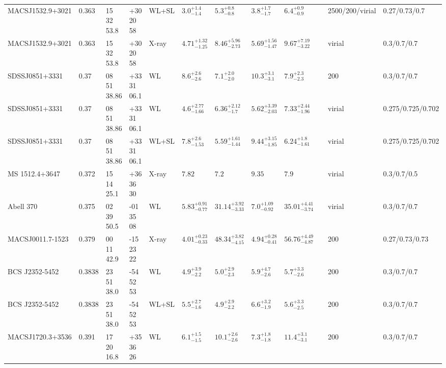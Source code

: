 \begin{landscape}
\begin{center}
{\begin{longtable}{llllllllllll}
MACSJ1532.9+3021 & 0.363 & 15 32 53.8 & +30 20 58 & WL+SL & ${3.0}^{+1.4}_{-1.4}$ & ${5.3}^{+0.8}_{-0.8}$ & ${3.8}^{+1.7}_{-1.7}$ & ${6.4}^{+0.9}_{-0.9}$ & \citet{ME14.1} & 2500/200/virial & 0.27/0.73/0.7 \\
MACSJ1532.9+3021 & 0.363 & 15 32 53.8 & +30 20 58 & X-ray & ${4.71}^{+1.32}_{-1.25}$ & ${8.46}^{+5.96}_{-2.73}$ & ${5.69}^{+1.56}_{-1.47}$ & ${9.67}^{+7.19}_{-3.22}$ & \citet{SC07.1} & virial & 0.3/0.7/0.7 \\
SDSSJ0851+3331 & 0.37 & 08 51 38.86 & +33 31 06.1 & WL & ${8.6}^{+2.6}_{-2.6}$ & ${7.1}^{+2.0}_{-2.0}$ & ${10.3}^{+3.1}_{-3.1}$ & ${7.9}^{+2.3}_{-2.3}$ & \citet{SE14.1} & 200 & 0.3/0.7/0.7 \\
SDSSJ0851+3331 & 0.37 & 08 51 38.86 & +33 31 06.1 & WL & ${4.6}^{+2.77}_{-1.66}$ & ${6.36}^{+2.12}_{-1.7}$ & ${5.62}^{+3.39}_{-2.03}$ & ${7.33}^{+2.44}_{-1.96}$ & \citet{OG12.1} & virial & 0.275/0.725/0.702 \\
SDSSJ0851+3331 & 0.37 & 08 51 38.86 & +33 31 06.1 & WL+SL & ${7.8}^{+2.6}_{-1.53}$ & ${5.59}^{+1.61}_{-1.44}$ & ${9.44}^{+3.15}_{-1.85}$ & ${6.24}^{+1.8}_{-1.61}$ & \citet{OG12.1} & virial & 0.275/0.725/0.702 \\
MS 1512.4+3647 & 0.372 & 15 14 25.1 & +36 36 30 & X-ray & ${7.82}^{}_{}$ & ${7.2}^{}_{}$ & ${9.35}^{}_{}$ & ${7.9}^{}_{}$ & \citet{MO99.1} & virial & 0.3/0.7/0.5 \\
Abell 370 & 0.375 & 02 39 50.5 & -01 35 08 & WL & ${5.83}^{+0.91}_{-0.77}$ & ${31.14}^{+3.92}_{-3.33}$ & ${7.0}^{+1.09}_{-0.92}$ & ${35.01}^{+4.41}_{-3.74}$ & \citet{UM11.1} & virial & 0.3/0.7/0.7 \\
MACSJ0011.7-1523 & 0.379 & 00 11 42.9 & -15 23 22 & X-ray & ${4.01}^{+0.23}_{-0.33}$ & ${48.34}^{+3.82}_{-4.15}$ & ${4.94}^{+0.28}_{-0.41}$ & ${56.76}^{+4.49}_{-4.87}$ & \citet{BA14.1} & 200 & 0.27/0.73/0.73 \\
BCS J2352-5452 & 0.3838 & 23 51 38.0 & -54 52 53 & WL & ${4.9}^{+3.9}_{-2.2}$ & ${5.0}^{+2.9}_{-2.3}$ & ${5.9}^{+4.7}_{-2.6}$ & ${5.7}^{+3.3}_{-2.6}$ & \citet{BU11.1} & 200 & 0.3/0.7/0.7 \\
BCS J2352-5452 & 0.3838 & 23 51 38.0 & -54 52 53 & WL+SL & ${5.5}^{+2.7}_{-1.6}$ & ${4.9}^{+2.9}_{-2.2}$ & ${6.6}^{+3.2}_{-1.9}$ & ${5.6}^{+3.3}_{-2.5}$ & \citet{BU11.1} & 200 & 0.3/0.7/0.7 \\
MACSJ1720.3+3536 & 0.391 & 17 20 16.8 & +35 36 26 & WL & ${6.1}^{+1.5}_{-1.5}$ & ${10.1}^{+2.6}_{-2.6}$ & ${7.3}^{+1.8}_{-1.8}$ & ${11.4}^{+3.1}_{-3.1}$ & \citet{SE14.1} & 200 & 0.3/0.7/0.7 \\

\end{longtable}}
\end{center}
\end{landscape}
